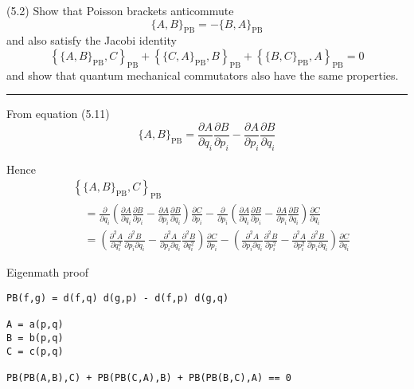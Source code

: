 \documentclass[12pt]{article}
\begin{document}
(5.2)
Show that Poisson brackets anticommute
\begin{equation*}
\{A,B\}_\mathrm{PB}=-\{B,A\}_\mathrm{PB}
\tag{5.59}
\end{equation*}
and also satisfy the Jacobi identity
\begin{equation*}
\left\{\{A,B\}_\mathrm{PB},C\right\}_\mathrm{PB}
+\left\{\{C,A\}_\mathrm{PB},B\right\}_\mathrm{PB}
+\left\{\{B,C\}_\mathrm{PB},A\right\}_\mathrm{PB}
=0
\tag{5.60}
\end{equation*}
and show that quantum mechanical commutators
also have the same properties.

\bigskip
\hrule

\bigskip
From equation (5.11)
\begin{equation*}
\{A,B\}_\mathrm{PB}
=\frac{\partial A}{\partial q_i}\frac{\partial B}{\partial p_i}
-\frac{\partial A}{\partial p_i}\frac{\partial B}{\partial q_i}
\tag{5.11}
\end{equation*}

Hence
\begin{align*}
&\left\{\{A,B\}_\mathrm{PB},C\right\}_\mathrm{PB}
\\
&\quad{}=\frac{\partial}{\partial q_i}
\left(
\frac{\partial A}{\partial q_i}\frac{\partial B}{\partial p_i}
-\frac{\partial A}{\partial p_i}\frac{\partial B}{\partial q_i}
\right)
\frac{\partial C}{\partial p_i}
-\frac{\partial}{\partial p_i}
\left(
\frac{\partial A}{\partial q_i}\frac{\partial B}{\partial p_i}
-\frac{\partial A}{\partial p_i}\frac{\partial B}{\partial q_i}
\right)
\frac{\partial C}{\partial q_i}
\\
&\quad{}=
\left(
\frac{\partial^2A}{\partial q_i^2}
\frac{\partial^2B}{\partial p_i\partial q_i}
-
\frac{\partial^2A}{\partial p_i\partial q_i}
\frac{\partial^2B}{\partial q_i^2}
\right)
\frac{\partial C}{\partial p_i}
-
\left(
\frac{\partial^2A}{\partial p_i\partial q_i}
\frac{\partial^2B}{\partial p_i^2}
-
\frac{\partial^2A}{\partial p_i^2}
\frac{\partial^2B}{\partial p_i\partial q_i}
\right)
\frac{\partial C}{\partial q_i}
\end{align*}

Eigenmath proof
\begin{verbatim}
PB(f,g) = d(f,q) d(g,p) - d(f,p) d(g,q)

A = a(p,q)
B = b(p,q)
C = c(p,q)

PB(PB(A,B),C) + PB(PB(C,A),B) + PB(PB(B,C),A) == 0
\end{verbatim}
\end{document}
